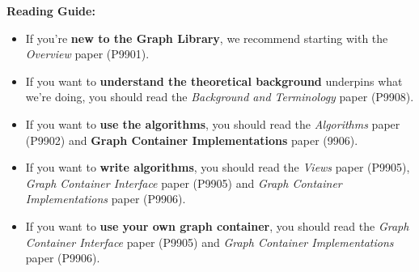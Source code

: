 \textbf{Reading Guide:} 
\begin{itemize}
  \item If you're \textbf{new to the Graph Library}, we recommend starting with the \textit{Overview} paper (P9901).
  \item If you want to \textbf{understand the theoretical background} underpins what we're doing, you should read the \textit{Background and Terminology} paper (P9908).
  \item If you want to \textbf{use the algorithms}, you should read the \textit{Algorithms} paper (P9902) and \textbf{Graph Container Implementations} paper (9906).
  \item If you want to \textbf{write algorithms}, you should read the \textit{Views} paper (P9905), \textit{Graph Container Interface} paper (P9905) and \textit{Graph Container Implementations} paper (P9906).
  \item If you want to \textbf{use your own graph container}, you should read the \textit{Graph Container Interface} paper (P9905) and \textit{Graph Container Implementations} paper (P9906).
\end{itemize}

  
%
